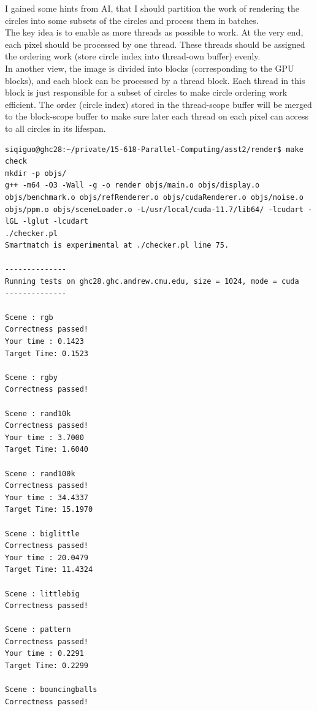 \documentclass[letterpaper,11pt]{exam}
\begin{document}
\begin{questions}
\begin{enumerate}[label=\roman*.]
\begin{itemize}
                        I gained some hints from AI, that I should partition the work of rendering the circles into some subsets of the circles and process them in batches. \\

                        The key idea is to enable as more threads as possible to work. At the very end, each pixel should be processed by one thread.
                        These threads should be assigned the ordering work (store circle index into thread-own buffer) evenly. \\

                        In another view, the image is divided into blocks (corresponding to the GPU blocks), and each block can be processed by a thread block.
                        Each thread in this block is just responsible for a subset of circles to make circle ordering work efficient.
                        The order (circle index) stored in the thread-scope buffer will be merged to the block-scope buffer to make sure later each thread on each pixel can access to all circles in its lifespan. \\

                        \begin{lstlisting}
siqiguo@ghc28:~/private/15-618-Parallel-Computing/asst2/render$ make check
mkdir -p objs/
g++ -m64 -O3 -Wall -g -o render objs/main.o objs/display.o objs/benchmark.o objs/refRenderer.o objs/cudaRenderer.o objs/noise.o objs/ppm.o objs/sceneLoader.o -L/usr/local/cuda-11.7/lib64/ -lcudart -lGL -lglut -lcudart 
./checker.pl
Smartmatch is experimental at ./checker.pl line 75.

--------------
Running tests on ghc28.ghc.andrew.cmu.edu, size = 1024, mode = cuda
--------------

Scene : rgb
Correctness passed!
Your time : 0.1423
Target Time: 0.1523

Scene : rgby
Correctness passed!

Scene : rand10k
Correctness passed!
Your time : 3.7000
Target Time: 1.6040

Scene : rand100k
Correctness passed!
Your time : 34.4337
Target Time: 15.1970

Scene : biglittle
Correctness passed!
Your time : 20.0479
Target Time: 11.4324

Scene : littlebig
Correctness passed!

Scene : pattern
Correctness passed!
Your time : 0.2291
Target Time: 0.2299

Scene : bouncingballs
Correctness passed!


\end{lstlisting}
\end{itemize}
\end{enumerate}
\end{questions}
\end{document}
